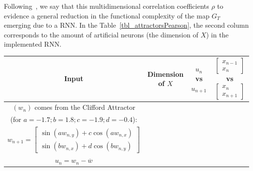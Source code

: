 Following~\cite{manjunath2021universal}, we say that this multidimensional correlation coefficients $\rho$ to evidence a general reduction in the functional complexity of the map $G_T$ emerging due to a RNN. In the 
Table~\ref{tbl_attractorsPearson}, the second column corresponds to the amount of artificial neurons (the dimension of $X$) in the implemented RNN.
               
  \begin{table} 
      \scalebox{0.65}
      \centering
      {\begin{tabular}{|c|c| c c |} 
          \toprule
          Input & Dimension of $X$ & $u_n$ vs $u_{n+1}$ 
          & $\begin{bmatrix}
              x_{n-1}\\
              x_n
          \end{bmatrix}$ vs $\begin{bmatrix}
              x_n\\
              x_{n+1}
          \end{bmatrix}$ \\
          \midrule      
               \midrule  
               $(w_n)$ comes from the Clifford Attractor \\ (for $a = -1.7; b = 1.8; c = -1.9; d = -0.4$): & & & \\
        {$w_{n+1}= \begin{bmatrix} \sin(aw_{n,y}) + c\cos(aw_{n,x}) \\ 
                                                                    \sin(bw_{n,x})+d\cos(bw_{n,y}) \end{bmatrix}$} & & & \\
          \multirow{3}{*}{$u_n = w_n-\overline{w}$}

\end{tabular}}
\end{table}
